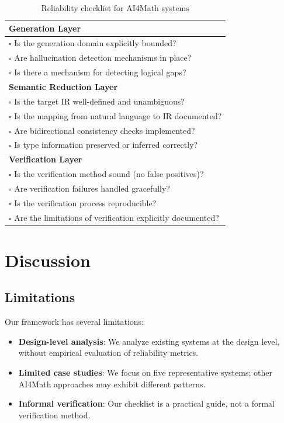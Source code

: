 \documentclass[11pt,a4paper]{article}
\begin{document}
\begin{table}[ht]
\centering
\caption{Reliability checklist for AI4Math systems}
\label{tab:checklist}
\begin{tabular}{p{}}
\toprule
\textbf{Generation Layer} \\
\midrule
$\square$ Is the generation domain explicitly bounded? \\
$\square$ Are hallucination detection mechanisms in place? \\
$\square$ Is there a mechanism for detecting logical gaps? \\
\midrule
\textbf{Semantic Reduction Layer} \\
\midrule
$\square$ Is the target IR well-defined and unambiguous? \\
$\square$ Is the mapping from natural language to IR documented? \\
$\square$ Are bidirectional consistency checks implemented? \\
$\square$ Is type information preserved or inferred correctly? \\
\midrule
\textbf{Verification Layer} \\
\midrule
$\square$ Is the verification method sound (no false positives)? \\
$\square$ Are verification failures handled gracefully? \\
$\square$ Is the verification process reproducible? \\
$\square$ Are the limitations of verification explicitly documented? \\
\bottomrule
\end{tabular}
\end{table}

\section{Discussion}
\label{sec:discussion}

\subsection{Limitations}

Our framework has several limitations:
\begin{itemize}
  \item \textbf{Design-level analysis}: We analyze existing systems at the design level, without empirical evaluation of reliability metrics.
  \item \textbf{Limited case studies}: We focus on five representative systems; other AI4Math approaches may exhibit different patterns.
  \item \textbf{Informal verification}: Our checklist is a practical guide, not a formal verification method.
\end{itemize}
\end{document}
